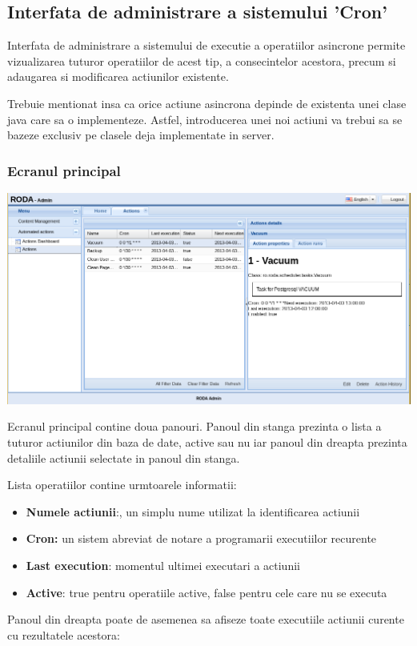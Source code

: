 
\subsection{Interfata de administrare a sistemului 'Cron'}

Interfata de administrare a sistemului de executie a operatiilor asincrone
permite vizualizarea tuturor operatiilor de acest tip, a consecintelor
acestora, precum si adaugarea si modificarea actiunilor existente. 

Trebuie mentionat insa ca orice actiune asincrona depinde de existenta
unei clase java care sa o implementeze. Astfel, introducerea unei
noi actiuni va trebui sa se bazeze exclusiv pe clasele deja implementate
in server. 


\subsubsection{Ecranul principal }

\includegraphics[width=\textwidth]{actionsview}

Ecranul principal contine doua panouri. Panoul din stanga prezinta
o lista a tuturor actiunilor din baza de date, active sau nu iar panoul
din dreapta prezinta detaliile actiunii selectate in panoul din stanga. 

Lista operatiilor contine urmtoarele informatii: 
\begin{itemize}
\item \textbf{Numele actiunii}:, un simplu nume utilizat la identificarea
actiunii 
\item \textbf{Cron:} un sistem abreviat de notare a programarii executiilor
recurente 
\item \textbf{Last execution}: momentul ultimei executari a actiunii 
\item \textbf{Active}: true pentru operatiile active, false pentru cele
care nu se executa
\end{itemize}
Panoul din dreapta poate de asemenea sa afiseze toate executiile actiunii
curente cu rezultatele acestora: 

